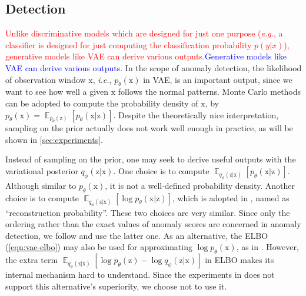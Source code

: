 \documentclass[sigconf]{acmart}
\newcommand\compactsub[2]{{\textcolor{red}{#1}}{\textcolor{blue}{#2}}}
\newcommand\compactsub[2]{#2}
\newcommand\compactvspace[1]{\vspace{#1}}
\newcommand\compactsub[2]{#1}
\newcommand\compactvspace[1]{}
\newcommand{\IE}{\textit{i.e.}}
\newcommand{\EG}{\textit{e.g.}}
\newcommand{\vv}[1]{\bm{\mathrm{{#1}}}}
\newcommand{\EEE}[2]{\operatorname{\mathbb{E}}_{{#1}}\left[{#2}\right]}
\begin{document}

\compactvspace{-.5em}
\subsection{Detection}
\label{sec:detection}

\compactsub{Unlike discriminative models which are designed for just one purpose (\EG, a classifier is designed for just computing the classification probability $p(y|x)$), generative models like VAE can derive various outputs.}{Generative models like VAE can derive various outputs.}
In the scope of anomaly detection, the likelihood of observation window $\vv{x}$, \IE, $p_{\theta}(\vv{x})$ in VAE, is an important output, since we want to see how well a given $\vv{x}$ follows the normal patterns.
Monte Carlo methods can be adopted to compute the probability density of $\vv{x}$, by $p_{\theta}(\vv{x}) = \EEE{p_{\theta}(\vv{z})}{p_{\theta}(\vv{x}|\vv{z})}$.
Despite the theoretically nice interpretation, sampling on the prior actually does not work well enough in practice, as will be shown in \cref{sec:experiments}.

Instead of sampling on the prior, one may seek to derive useful outputs with the variational posterior $q_{\phi}(\vv{z}|\vv{x})$.
One choice is to compute $\EEE{q_{\phi}(\vv{z}|\vv{x})}{p_{\theta}(\vv{x}|\vv{z})}$.
Although similar to $p_{\theta}(\vv{x})$, it is not a well-defined probability density.
Another choice is to compute $\EEE{q_{\phi}(\vv{z}|\vv{x})}{\log p_{\theta}(\vv{x}|\vv{z})}$, which is adopted in \cite{vae-ad}, named as ``reconstruction probability''.
These two choices are very similar.
Since only the ordering rather than the exact values of anomaly scores are concerned in anomaly detection, we follow \cite{vae-ad} and use the latter one. As an alternative, the ELBO (\cref{eqn:vae-elbo}) may also be used for approximating $\log p_{\theta}(\vv{x})$, as in \cite{vi-storn}.
However, the extra term $\EEE{q_{\phi}(\vv{z}|\vv{x})}{\log p_{\theta}(\vv{z}) - \log q_{\phi}(\vv{z}|\vv{x})}$ in ELBO makes its internal mechanism hard to understand.
Since the experiments in \cite{vi-storn} does not support this alternative's superiority, we choose not to use it.
\end{document}
